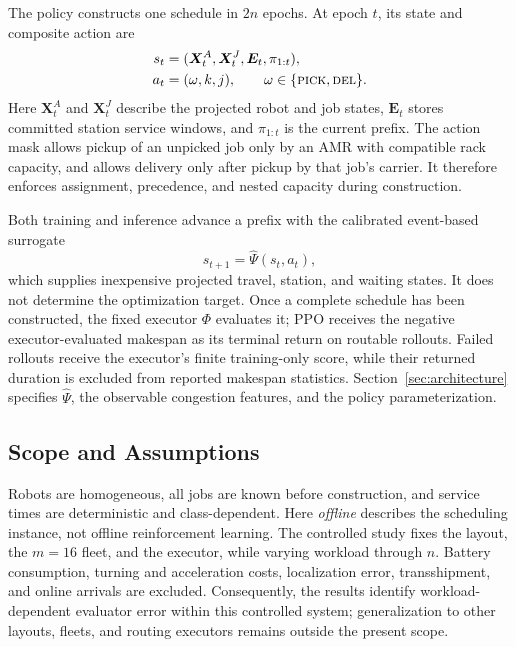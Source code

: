 The policy constructs one schedule in $2n$ epochs. At epoch $t$, its state and
composite action are
\begin{align}
 s_t&=(\bm X_t^A,\bm X_t^J,\bm E_t,\pi_{1:t}),
                                                        \label{eq:state}\\
 a_t&=(\omega,k,j),\qquad
 \omega\in\{\textsc{pick},\textsc{del}\}.             \label{eq:action}
\end{align}
Here $\bm X_t^A$ and $\bm X_t^J$ describe the projected robot and job states,
$\bm E_t$ stores committed station service windows, and $\pi_{1:t}$ is the
current prefix. The action mask allows pickup of an unpicked job only by an
AMR with compatible rack capacity, and allows delivery only after pickup by
that job's carrier. It therefore enforces assignment, precedence, and nested
capacity during construction.

Both training and inference advance a prefix with the calibrated event-based
surrogate
\begin{equation}
 s_{t+1}=\widehat\Psi(s_t,a_t),
 \label{eq:surrogate-transition}
\end{equation}
which supplies inexpensive projected travel, station, and waiting states. It
does not determine the optimization target. Once a complete schedule has
been constructed, the fixed executor $\Phi$ evaluates it; PPO receives the
negative executor-evaluated makespan as its terminal return on routable
rollouts. Failed rollouts receive the executor's finite training-only score,
while their returned duration is excluded from reported makespan statistics.
Section~\ref{sec:architecture} specifies $\widehat\Psi$, the observable
congestion features, and the policy parameterization.

\subsection{Scope and Assumptions}
\label{sec:assumptions}

Robots are homogeneous, all jobs are known before construction, and service
times are deterministic and class-dependent. Here \emph{offline} describes
the scheduling instance, not offline reinforcement learning. The controlled
study fixes the layout, the $m=16$ fleet, and the executor, while varying
workload through $n$. Battery consumption, turning and acceleration costs,
localization error, transshipment, and online arrivals are excluded.
Consequently, the results identify workload-dependent evaluator error within
this controlled system; generalization to other layouts, fleets, and routing
executors remains outside the present scope.
